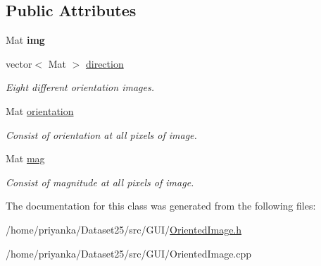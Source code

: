 \subsection*{\-Public \-Attributes}
\begin{DoxyCompactItemize}
\item 
\hypertarget{classOrientedImage_ae66b3ec7d333c3b0fee903621db1c5ca}{\-Mat {\bfseries img}}\label{classOrientedImage_ae66b3ec7d333c3b0fee903621db1c5ca}

\item 
\hypertarget{classOrientedImage_a255499d9697a23eb069d43093ee3d234}{vector$<$ \-Mat $>$ \hyperlink{classOrientedImage_a255499d9697a23eb069d43093ee3d234}{direction}}\label{classOrientedImage_a255499d9697a23eb069d43093ee3d234}

\begin{DoxyCompactList}\small\item\em \-Eight different orientation images. \end{DoxyCompactList}\item 
\hypertarget{classOrientedImage_aad0fb09bf554c108b7b7c3ffcea29c5f}{\-Mat \hyperlink{classOrientedImage_aad0fb09bf554c108b7b7c3ffcea29c5f}{orientation}}\label{classOrientedImage_aad0fb09bf554c108b7b7c3ffcea29c5f}

\begin{DoxyCompactList}\small\item\em \-Consist of orientation at all pixels of image. \end{DoxyCompactList}\item 
\hypertarget{classOrientedImage_a0a4df5ff44a51133f542eb72cfbbef42}{\-Mat \hyperlink{classOrientedImage_a0a4df5ff44a51133f542eb72cfbbef42}{mag}}\label{classOrientedImage_a0a4df5ff44a51133f542eb72cfbbef42}

\begin{DoxyCompactList}\small\item\em \-Consist of magnitude at all pixels of image. \end{DoxyCompactList}\end{DoxyCompactItemize}


\-The documentation for this class was generated from the following files\-:\begin{DoxyCompactItemize}
\item 
/home/priyanka/\-Dataset25/src/\-G\-U\-I/\hyperlink{OrientedImage_8h}{\-Oriented\-Image.\-h}\item 
/home/priyanka/\-Dataset25/src/\-G\-U\-I/\-Oriented\-Image.\-cpp\end{DoxyCompactItemize}
